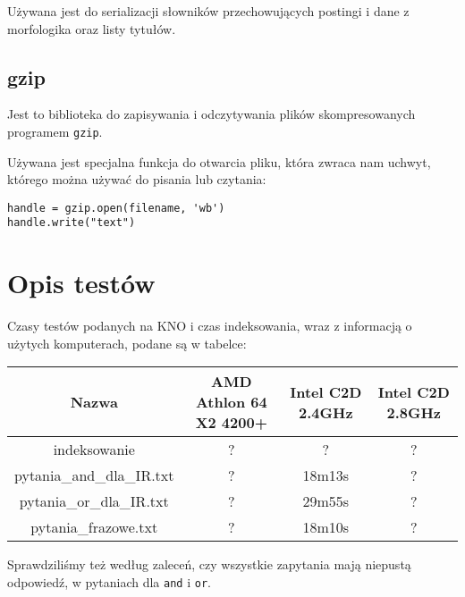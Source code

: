 \documentclass[11pt]{article}
\begin{document}
Używana jest do serializacji słowników przechowujących postingi i dane z morfologika oraz listy tytułów.

\subsection{gzip}
Jest to biblioteka do zapisywania i odczytywania plików skompresowanych programem \texttt{gzip}.

Używana jest specjalna funkcja do otwarcia pliku, która zwraca nam uchwyt, którego można używać do pisania lub czytania:
\begin{verbatim}
handle = gzip.open(filename, 'wb') 
handle.write("text")
\end{verbatim}

\section{Opis testów}
Czasy testów podanych na KNO i czas indeksowania, wraz z informacją o użytych komputerach, podane są w tabelce:
\begin{center}
\begin{tabular}{|c|c|c|c|}
\hline
Nazwa & AMD Athlon 64 X2 4200+ & Intel C2D 2.4GHz & Intel C2D 2.8GHz \\ \hline
indeksowanie & ? & ? & ? \\ \hline
pytania\_and\_dla\_IR.txt & ? & 18m13s & ? \\ \hline
pytania\_or\_dla\_IR.txt & ? & 29m55s & ? \\ \hline
pytania\_frazowe.txt & ? & 18m10s & ? \\ \hline
\end{tabular}
\end{center}

Sprawdziliśmy też według zaleceń, czy wszystkie zapytania mają niepustą odpowiedź, w pytaniach dla \texttt{and} i \texttt{or}.
\end{document}
